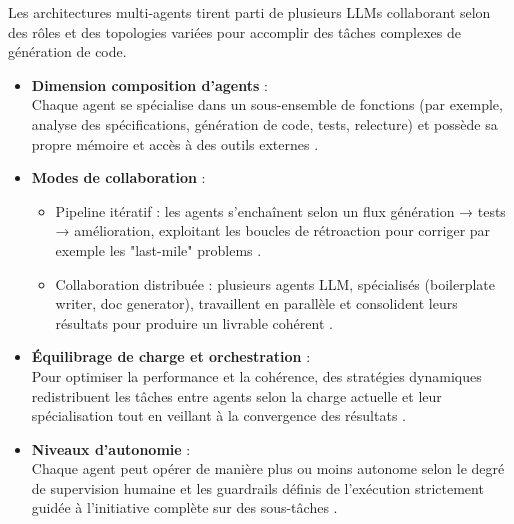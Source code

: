 Les architectures multi-agents tirent parti de plusieurs LLMs collaborant selon des rôles et des topologies variées pour accomplir des tâches complexes de génération de code. 



%

\begin{itemize}
  \item \textbf{Dimension composition d’agents} : \\
    Chaque agent se spécialise dans un sous-ensemble de fonctions (par exemple, analyse des spécifications, génération de code, tests, relecture) et possède sa propre mémoire et accès à des outils externes \parencite{handler_taxonomy_2023}.
%
    
\item \textbf{Modes de collaboration} :
  \begin{itemize}
    \item Pipeline itératif : les agents s’enchaînent selon un flux génération → tests → amélioration, exploitant les boucles de rétroaction pour corriger par exemple les "last-mile" problems \parencite{vallecillos_ruiz_agent-driven_2024}.
    \item Collaboration distribuée : plusieurs agents LLM, spécialisés (boilerplate writer, doc generator), travaillent en parallèle et consolident leurs résultats pour produire un livrable cohérent \parencite{zahid_multi-agent_2024}.
  \end{itemize}


  \item \textbf{Équilibrage de charge et orchestration} : \\
    Pour optimiser la performance et la cohérence, des stratégies dynamiques redistribuent les tâches entre agents selon la charge actuelle et leur spécialisation  tout en veillant à la convergence des résultats \parencite{handler_balancing_2023}.

  \item \textbf{Niveaux d’autonomie} : \\
    Chaque agent peut opérer de manière plus ou moins autonome selon le degré de supervision humaine et les guardrails définis de l’exécution strictement guidée à l’initiative complète sur des sous-tâches \parencite{handler_taxonomy_2023}.
\end{itemize}

